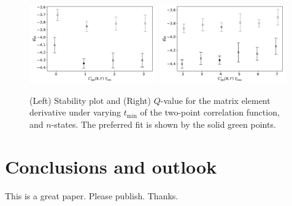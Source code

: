 \documentclass[prd,aps,twocolumn,superscriptaddress,tightenlines,nofootinbib,floatfix,preprintnumbers,10pt]{revtex4-1}
\begin{document}
\begin{figure}[t]{
		\includegraphics[width=0.49\textwidth]{plots/figures/3296_dgV8_dgV.pdf}
		\includegraphics[width=0.49\textwidth]{plots/figures/3296_dgV8_tmax_dgV.pdf}
		\caption{(Left) Stability plot and (Right) $Q$-value for the matrix element derivative under varying $t_{\mathrm{min}}$ of the two-point correlation function, and $n$-states. The preferred fit is shown by the solid green points.}
		\label{fig:stability_main}
}\end{figure}

\section{Conclusions and outlook}
This is a great paper. Please publish. Thanks.



\appendix

\clearpage
\newpage
\onecolumngrid
\end{document}
